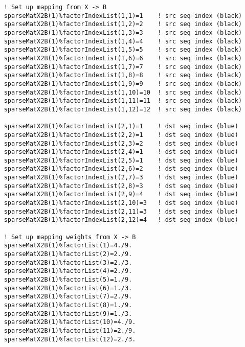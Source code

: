  \begin{verbatim}
    ! Set up mapping from X -> B
    sparseMatX2B(1)%factorIndexList(1,1)=1    ! src seq index (black)
    sparseMatX2B(1)%factorIndexList(1,2)=2    ! src seq index (black)
    sparseMatX2B(1)%factorIndexList(1,3)=3    ! src seq index (black)
    sparseMatX2B(1)%factorIndexList(1,4)=4    ! src seq index (black)
    sparseMatX2B(1)%factorIndexList(1,5)=5    ! src seq index (black)
    sparseMatX2B(1)%factorIndexList(1,6)=6    ! src seq index (black)
    sparseMatX2B(1)%factorIndexList(1,7)=7    ! src seq index (black)
    sparseMatX2B(1)%factorIndexList(1,8)=8    ! src seq index (black)
    sparseMatX2B(1)%factorIndexList(1,9)=9    ! src seq index (black)
    sparseMatX2B(1)%factorIndexList(1,10)=10  ! src seq index (black)
    sparseMatX2B(1)%factorIndexList(1,11)=11  ! src seq index (black)
    sparseMatX2B(1)%factorIndexList(1,12)=12  ! src seq index (black)

    sparseMatX2B(1)%factorIndexList(2,1)=1    ! dst seq index (blue)
    sparseMatX2B(1)%factorIndexList(2,2)=1    ! dst seq index (blue)
    sparseMatX2B(1)%factorIndexList(2,3)=2    ! dst seq index (blue)
    sparseMatX2B(1)%factorIndexList(2,4)=1    ! dst seq index (blue)
    sparseMatX2B(1)%factorIndexList(2,5)=1    ! dst seq index (blue)
    sparseMatX2B(1)%factorIndexList(2,6)=2    ! dst seq index (blue)
    sparseMatX2B(1)%factorIndexList(2,7)=3    ! dst seq index (blue)
    sparseMatX2B(1)%factorIndexList(2,8)=3    ! dst seq index (blue)
    sparseMatX2B(1)%factorIndexList(2,9)=4    ! dst seq index (blue)
    sparseMatX2B(1)%factorIndexList(2,10)=3   ! dst seq index (blue)
    sparseMatX2B(1)%factorIndexList(2,11)=3   ! dst seq index (blue)
    sparseMatX2B(1)%factorIndexList(2,12)=4   ! dst seq index (blue)

    ! Set up mapping weights from X -> B
    sparseMatX2B(1)%factorList(1)=4./9.
    sparseMatX2B(1)%factorList(2)=2./9.
    sparseMatX2B(1)%factorList(3)=2./3.
    sparseMatX2B(1)%factorList(4)=2./9.
    sparseMatX2B(1)%factorList(5)=1./9.
    sparseMatX2B(1)%factorList(6)=1./3.
    sparseMatX2B(1)%factorList(7)=2./9.
    sparseMatX2B(1)%factorList(8)=1./9.
    sparseMatX2B(1)%factorList(9)=1./3.
    sparseMatX2B(1)%factorList(10)=4./9.
    sparseMatX2B(1)%factorList(11)=2./9.
    sparseMatX2B(1)%factorList(12)=2./3.
 
\end{verbatim}
 

